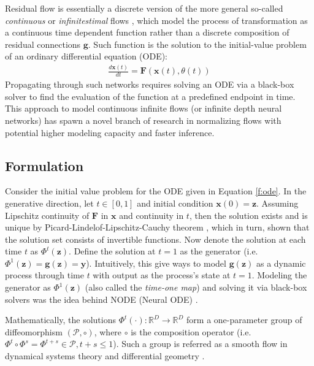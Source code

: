 Residual flow is essentially a discrete version of the more general so-called
\textit{continuous} or \textit{infinitestimal} flows \cite{chenNeuralOrdinaryDifferential2019}, which model the process of
transformation as a continuous time dependent function rather than a discrete
composition of residual connections $\mathbf{g}$. Such function is the solution to the
initial-value problem of an ordinary differential equation (ODE):
\begin{align}
\label{f:ode}
  \frac{d \mathbf{x}(t)}{d t} =
  \mathbf{F}(\mathbf{x}(t), \theta(t))
\end{align}
Propagating through such networks requires
solving an ODE via a black-box solver to find the evaluation of the function at
a predefined endpoint in time. This approach to model continuous
infinite flows (or infinite depth neural networks) has spawn a novel branch of
research in normalizing flows with potential higher modeling capacity and faster
inference.
\subsection{Formulation}

Consider the initial value problem for the ODE given in Equation \ref{f:ode}. In
the generative direction, let $t \in [0,1]$ and initial condition $\mathbf{x}(0)
= \mathbf{z}$. Assuming Lipschitz continuity of $\mathbf{F}$ in $\mathbf{x}$ and
continuity in $t$, then the solution exists and is unique by
Picard-Lindelof-Lipschitz-Cauchy theorem
\cite{arnoldOrdinaryDifferentialEquations1992}, which in turn, shown that the
solution set consists of invertible functions. Now denote the solution at each
time $t$ as $\Phi^t(\mathbf{z})$. Define the solution at $t=1$ as the generator
(i.e. $\Phi^1(\mathbf{z}) = \mathbf{g}(\mathbf{z}) = \mathbf{y}$). Intuitively,
this give ways to model $\mathbf{g}(\mathbf{z})$ as a dynamic process through
time $t$ with output as the process's state at $t=1$. Modeling the generator as
$\Phi^1(\mathbf{z})$ (also called the \textit{time-one map}) and solving it via
black-box solvers was the idea behind NODE (Neural ODE)
\cite{chenNeuralOrdinaryDifferential2019}.

Mathematically, the solutions $\Phi^t(\cdot):
\mathbb{R}^D \to \mathbb{R}^D$ form a one-parameter group of diffeomorphism $(\mathcal{P},
\circ)$, where $\circ$ is the composition operator (i.e. $\Phi^t \circ \Phi^s =
\Phi^{t+s} \in \mathcal{P}, t+s \leq 1$). Such a group is referred as a smooth flow
in dynamical systems theory and differential geometry \cite{katokIntroductionModernTheory1997}.

